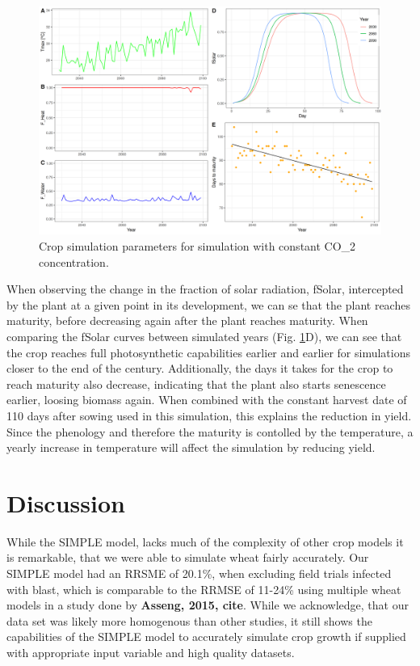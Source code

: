 \documentclass[11pt]{article}
\begin{document}
\begin{figure}[htbp]
\centering
\includegraphics[width=1\textwidth]{../results/cc-model/paras_sim.png}
\caption{\label{paras-sim}Crop simulation parameters for simulation with constant CO\_2 concentration.}
\end{figure}

When observing the change in the fraction of solar radiation, fSolar, intercepted by the plant at a given point in its development, we can se that the plant reaches maturity, before decreasing again after the plant reaches maturity.
When comparing the fSolar curves between simulated years (Fig. \ref{paras-sim}D), we can see that the crop reaches full photosynthetic capabilities earlier and earlier for simulations closer to the end of the century. Additionally, the days it takes for the crop to reach maturity also decrease, indicating that the plant also starts senescence earlier, loosing biomass again. When combined with the constant harvest date of 110 days after sowing used in this simulation, this explains the reduction in yield. Since the phenology and therefore the maturity is contolled by the temperature, a yearly increase in temperature will affect the simulation by reducing yield.


\section{Discussion}
\label{sec:orgde98c9e}
While the SIMPLE model, lacks much of the complexity of other crop models it is remarkable, that we were able to simulate wheat fairly accurately. Our SIMPLE model had an RRSME of 20.1\%, when excluding field trials infected with blast, which is comparable to the RRMSE of 11-24\% using multiple wheat models in a study done by \textbf{Asseng, 2015, cite}. While we acknowledge, that our data set was likely more homogenous than other studies, it still shows the capabilities of the SIMPLE model to accurately simulate crop growth if supplied with appropriate input variable and high quality datasets.
\end{document}
